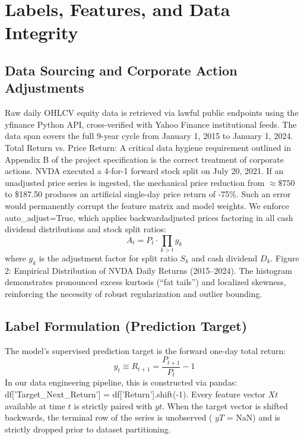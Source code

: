 \documentclass[12pt, a4paper]{article}
\begin{document}
\section{Labels, Features, and Data Integrity}
\subsection{Data Sourcing and Corporate Action Adjustments}
Raw daily OHLCV equity data is retrieved via lawful public endpoints using the yfinance Python API, 
cross-verified with Yahoo Finance institutional feeds. The data span covers the full 9-year cycle from 
January 1, 2015 to January 1, 2024.
Total Return vs. Price Return: A critical data hygiene requirement outlined in Appendix B of the project 
specification is the correct treatment of corporate actions. NVDA executed a 4-for-1 forward stock split 
on July 20, 2021. If an unadjusted price series is ingested, the mechanical price reduction from $\approx \$750$ 
to \$187.50 produces an artificial single-day price return of -75\%. Such an error would permanently 
corrupt the feature matrix and model weights. We enforce auto\_adjust=True, which applies backwardadjusted prices factoring in all cash dividend distributions and stock split ratios:
\begin{equation}
A_t = P_t \cdot \prod_{k > t} g_k
\end{equation}
where $g_k$ is the adjustment factor for split ratio $S_k$ and cash dividend $D_k$.
Figure 2: Empirical Distribution of NVDA Daily Returns (2015--2024). The histogram demonstrates 
pronounced excess kurtosis (``fat tails'') and localized skewness, reinforcing the necessity of robust 
regularization and outlier bounding.

\subsection{Label Formulation (Prediction Target)}
The model's supervised prediction target is the forward one-day total return:
\begin{equation}
y_t \equiv R_{t+1} = \frac{P_{t+1}}{P_t} - 1
\end{equation}
In our data engineering pipeline, this is constructed via pandas: df['Target\_Next\_Return'] = 
df['Return'].shift(-1). Every feature vector $Xt$ available at time $t$ is strictly paired with $yt$. When 
the target vector is shifted backwards, the terminal row of the series is unobserved ( $yT$ = NaN) and is 
strictly dropped prior to dataset partitioning.
\end{document}
